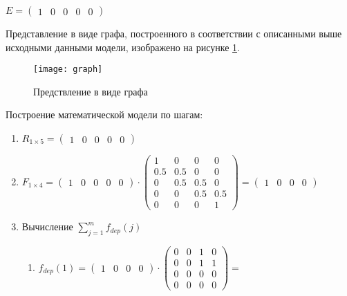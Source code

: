 \begin{center}
  $
  E = \begin{pmatrix}
    1 & 0 & 0 & 0 & 0
  \end{pmatrix}
  $
\end{center}

Представление в виде графа, построенного в соответствии с описанными выше исходными данными модели, изображено на рисунке \ref{fig:graph}.

\begin{figure}[H]
  \centering
  \texttt{[image: graph]}
  \caption{Предствление в виде графа}
  \label{fig:graph}
\end{figure}

Построение математической модели по шагам:
\begin{enumerate}
  \item 
  $
    R_{1 \times 5} = 
    \begin{pmatrix}
      1 & 0 & 0 & 0 & 0
    \end{pmatrix}
  $
  \item 
  $
    F_{1 \times 4} = 
    \begin{pmatrix}
      1 & 0 & 0 & 0 & 0
    \end{pmatrix}
    \cdot
    \begin{pmatrix}
      1 &   0 &   0 & 0   \\
    0.5 & 0.5 &   0 & 0   \\
      0 & 0.5 & 0.5 & 0   \\
      0 &   0 & 0.5 & 0.5 \\
      0 &   0 &   0 & 1 
  \end{pmatrix}
  = \begin{pmatrix}
      1 & 0 & 0 & 0
    \end{pmatrix}
  $
  \item Вычисление $\sum^{m}_{j = 1}f_{dep}(j)$
  \begin{enumerate}
    \item $
    f_{dep}(1) = 
      \begin{pmatrix}
        1 & 0 & 0 & 0
      \end{pmatrix}
      \cdot
      \begin{pmatrix}
        0 & 0 & 1 & 0   \\
        0 & 0 & 1 & 1   \\
        0 & 0 & 0 & 0   \\
        0 & 0 & 0 & 0 
      \end{pmatrix}
      = 
    $
  \end{enumerate}
\end{enumerate}


